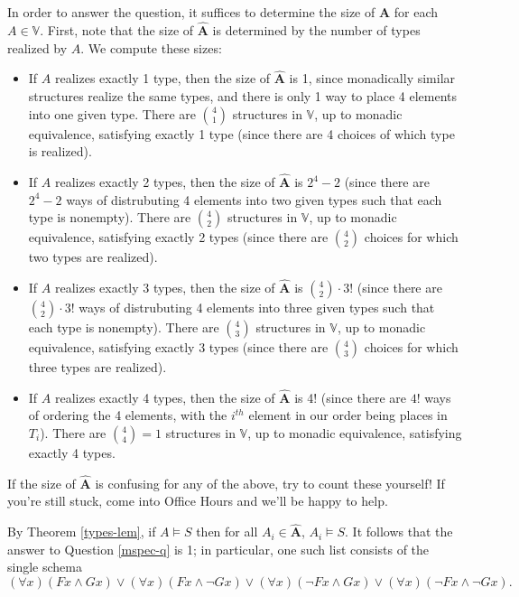 In order to answer the question, it suffices to determine the size of $\bm\hat{A}$ for each $A\in\mathbb{V}$. First, note that the size of $\bm\hat{A}$ is determined by the number of types realized by $A$. We compute these sizes:
\begin{itemize}
\item
If $A$ realizes exactly 1 type, then the size of $\bm\hat{A}$ is 1, since monadically similar structures realize the same types, and there is only 1 way to place 4 elements into one given type. There are $\binom{4}{1}$ structures in $\mathbb{V}$, up to monadic equivalence, satisfying exactly 1 type (since there are 4 choices of which type is realized).
\item
If $A$ realizes exactly 2 types, then the size of $\bm\hat{A}$ is $2^4-2$ (since there are $2^4 - 2$ ways of distrubuting 4 elements into two given types such that each type is nonempty). There are $\binom{4}{2}$ structures in $\mathbb{V}$, up to monadic equivalence, satisfying exactly 2 types (since there are $\binom{4}{2}$ choices for which two types are realized).
\item
If $A$ realizes exactly 3 types, then the size of $\bm\hat{A}$ is $\binom{4}{2}\cdot3!$ (since there are $\binom{4}{2}\cdot3!$ ways of distrubuting 4 elements into three given types such that each type is nonempty). There are $\binom{4}{3}$ structures in $\mathbb{V}$, up to monadic equivalence, satisfying exactly 3 types (since there are $\binom{4}{3}$ choices for which three types are realized).
\item
If $A$ realizes exactly 4 types, then the size of $\bm\hat{A}$ is 4! (since there are $4!$ ways of ordering the 4 elements, with the $i^{th}$ element in our order being places in $T_i$). There are $\binom{4}{4} = 1$ structures in $\mathbb{V}$, up to monadic equivalence, satisfying exactly 4 types.
\end{itemize}
\begin{aside}
    If the size of $\bm\hat{A}$ is confusing for any of the above, try to count these yourself! If you're still stuck, come into Office Hours and we'll be happy to help. 
\end{aside}

By Theorem \ref{types-lem}, if $A \models S$ then for all $A_i \in \bm\hat{A}$, $A_i \models S$. It follows that the answer to Question \ref{mspec-q} is 1; in particular, one such list consists of the single schema
\[(\forall x)(Fx\wedge Gx)\vee(\forall x)(Fx\wedge \neg Gx)\vee(\forall x)(\neg Fx\wedge Gx)\vee(\forall x)(\neg Fx\wedge \neg Gx).\]

